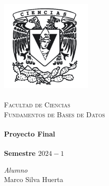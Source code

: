 \begin{titlepage}
    \center\newcommand{\HRule}{\rule{\linewidth}{0.5mm}} 
    
    \includegraphics[width=4.5cm]{IMA/Ciencias.png} \\ 
    
    \quad \\[1.5cm]    
    \textsc{\Large Facultad de Ciencias}\\[0.5cm] 
    \textsc{\Large Fundamentos de Bases de Datos}\\[0.5cm] 
    
    \makeatletter
        \HRule\\ [0.4cm]
            { \huge \bfseries Proyecto Final}\\
        \HRule\\ [0.4cm]
    \large\textbf{Semestre $2024-1$}\\
    
    \vspace{15mm}
    \begin{minipage}{0.4\textwidth}
        \begin{flushright} \large
        \centering
            \emph{Alumno} \\ %
            \vspace{3mm}
            Marco Silva Huerta\\                
        \end{flushright}
    \end{minipage}\\[1.8cm]
    

\end{titlepage}
